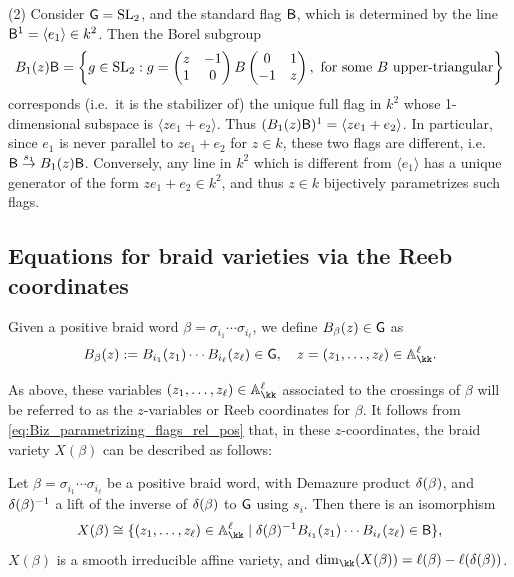 \begin{example}
\noindent (2) Consider $\mathsf{G}=\operatorname{SL}_2$, and the standard flag $\mathsf{B}$, which is determined by the line $\mathsf{B}^1=\langle e_1\rangle\in k^2$. Then the Borel subgroup
$$B_1(z)\mathsf{B}=\left\{g\in\operatorname{SL}_2: g=\begin{pmatrix}
z & -1\\
1 & 0
\end{pmatrix}B\begin{pmatrix}
0 & 1\\
-1 & z
\end{pmatrix},\mbox{ for some }B\mbox{ upper-triangular}\right\}$$
corresponds (i.e.~it is the stabilizer of) the unique full flag in $k^2$ whose 1-dimensional subspace is $\langle ze_1+e_2\rangle$. Thus $(B_1(z)\mathsf{B})^1=\langle ze_1+e_2\rangle$. In particular, since $e_1$ is never parallel to $ze_1+e_2$ for $z\in k$, these two flags are different, i.e.~$\mathsf{B}\stackrel{s_1}{\to}B_1(z)\mathsf{B}$. Conversely, any line in $k^2$ which is different from $\langle e_1\rangle$ has a unique generator of the form $ze_1+e_2\in k^2$, and thus $z\in k$ bijectively parametrizes such flags.\sbs
\end{example}

\subsection{Equations for braid varieties via the Reeb coordinates}\label{ssec:equation_braid_varieties_Reeb_coordinates} Given a positive braid word $\beta = \sigma_{i_{1}}\cdots \sigma_{i_{\ell}}$, we define $B_{\beta}(z)\in\mathsf{G}$ as
\begin{equation}\label{eq:braid_matrix}
B_{\beta}(z) := B_{i_{1}}(z_1)\cdots B_{i_{\ell}}(z_\ell) \in \G,\quad z=(z_1,\ldots,z_\ell)\in \mathbb{A}_\kk^{\ell}.
\end{equation}

\noindent As above, these variables $(z_1,\ldots,z_\ell)\in \mathbb{A}_\kk^{\ell}$ associated to the crossings of $\beta$ will be referred to as the $z$-variables or Reeb coordinates for $\beta$. It follows from \cref{eq:Biz_parametrizing_flags_rel_pos} that, in these $z$-coordinates, the braid variety $X(\beta)$ can be described as follows:

\begin{lemma}\label{lem:equations_braidvar}
Let $\beta = \sigma_{i_{1}}\cdots \sigma_{i_{\ell}}$ be a positive braid word, with Demazure product $\delta(\beta)$, and $\delta(\beta)^{-1}$ a lift of the inverse of $\delta(\beta)$ to $\mathsf{G}$ using $s_i$. Then there is an isomorphism
\begin{equation}\label{eq:braid_var_eq}
X(\beta) \cong \{(z_1, \dots, z_\ell) \in \mathbb{A}_\kk^{\ell} \mid \delta(\b)^{-1}B_{i_{1}}(z_1)\cdots B_{i_{\ell}}(z_\ell) \in \borel\},
\end{equation}
$X(\beta)$ is a smooth irreducible affine variety, and $\dim_\kk(X(\beta))=\ell(\b)-\ell(\delta(\b))$.
\sbs
\end{lemma}

